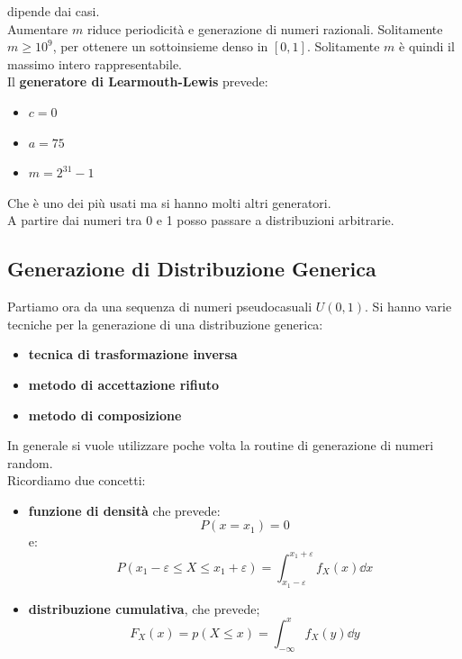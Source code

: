 \message{ !name(modprob.tex)}\documentclass[a4paper,12pt, oneside]{book}
\begin{document}
dipende dai casi.\\
Aumentare $m$ riduce periodicità e generazione di numeri razionali. Solitamente
$m\geq 10^9$, per ottenere un sottoinsieme denso in $[0,1]$. Solitamente $m$ è
quindi il massimo intero rappresentabile.\\
Il \textbf{generatore di Learmouth-Lewis} prevede:
\begin{itemize}
  \item $c=0$
  \item $a=75$
  \item $m=2^{31}-1$
\end{itemize}
Che è uno dei più usati ma si hanno molti altri generatori.\\
A partire dai numeri tra 0 e 1 posso passare a distribuzioni arbitrarie.\\
\subsection{Generazione di Distribuzione Generica}
Partiamo ora da una sequenza di numeri pseudocasuali $U(0,1)$. Si hanno varie
tecniche per la generazione di una distribuzione generica:
\begin{itemize}
  \item \textbf{tecnica di trasformazione inversa}
  \item \textbf{metodo di accettazione rifiuto}
  \item \textbf{metodo di composizione}
\end{itemize}
In generale si vuole utilizzare poche volta la routine di generazione di numeri
random. \\
Ricordiamo due concetti:
\begin{itemize}
  \item \textbf{funzione di densità} che prevede:
  \[P(x=x_1)=0\]
  e:
  \[P(x_1-\varepsilon\leq X\leq
    x_1+\varepsilon)=\int_{x_1-\varepsilon}^{x_1+\varepsilon} f_X(x)\dd{x}\]
  \item \textbf{distribuzione cumulativa}, che prevede;
  \[F_X(x)=p(X\leq x)=\int_{-\infty}^x f_X(y)\dd{y}\]
\end{itemize}
\end{document}
